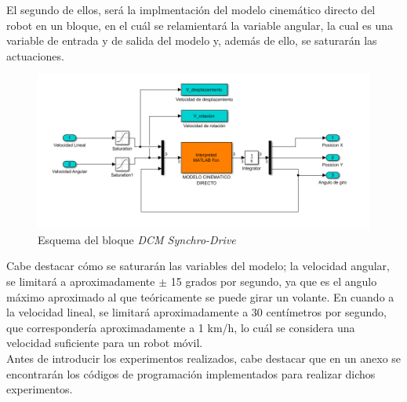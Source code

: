 \documentclass[a4paper,twoside]{article}
\begin{document}
 El segundo de ellos, será la implmentación del modelo cinemático directo del robot en un bloque, en el cuál se relamientará la variable angular, la cual es una variable de entrada y de salida del modelo y, además de ello, se saturarán las actuaciones.
 \begin{figure}[h!]
	 \centering
	 \includegraphics[width=.65\textwidth]{simulink_MCD_3}
	 \caption{Esquema del bloque \textit{DCM Synchro-Drive}}
 \end{figure}

\newpage
Cabe destacar cómo se saturarán las variables del modelo; la velocidad angular, se limitará a aproximadamente $\pm$ 15 grados por segundo, ya que es el angulo máximo aproximado al que teóricamente se puede girar un volante. En cuando a la velocidad lineal, se limitará aproximadamente a 30 centímetros por segundo, que correspondería aproximadamente a 1 km/h, lo cuál se considera una velocidad suficiente para un robot móvil.\\

Antes de introducir los experimentos realizados, cabe destacar que en un anexo se encontrarán los códigos de programación implementados para realizar dichos experimentos.
\end{document}
